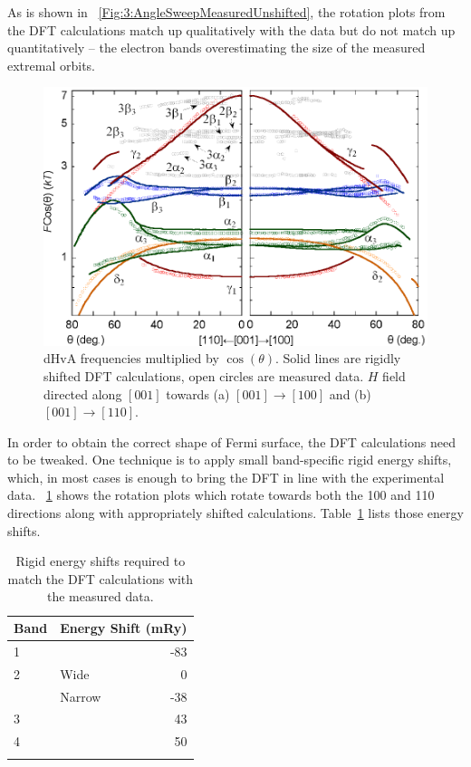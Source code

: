 As is shown in \fig~\ref{Fig:3:AngleSweepMeasuredUnshifted}, the rotation plots from the DFT calculations match up qualitatively with the data but do not match up quantitatively -- the electron bands overestimating the size of the measured extremal orbits. 

\begin{figure}[htbp]
    \begin{center}
        \includegraphics[scale=0.9]{Chapter3-dHvABaFe2P2/Figures/AngleDepMeasurements/AngleSweepRigidShift/AngleSweepRigidShift}
        \caption{dHvA frequencies multiplied by $\cos(\theta)$. Solid lines are rigidly shifted DFT calculations, open circles are measured data. $H$ field directed along $[001]$ towards (a) $[001]\rightarrow[100]$ and (b) $[001]\rightarrow[110]$.}
        \label{Fig:3:AngleSweepRigidShift}
    \end{center}
\end{figure}

In order to obtain the correct shape of Fermi surface, the DFT calculations need to be tweaked. One technique is to apply small band-specific rigid energy shifts, which, in most cases is enough to bring the DFT in line with the experimental data. \fig~\ref{Fig:3:AngleSweepRigidShift} shows the rotation plots which rotate towards both the 100 and 110 directions along with appropriately shifted calculations. Table~\ref{Table:3:EnergyShifts} lists those energy shifts.
\begin{table}
    \begin{center}
        \caption{Rigid energy shifts required to match the DFT calculations with the measured data.}
        \begin{tabular}[htbp]{llr}
\toprule
Band    & \multicolumn{2}{l}{Energy Shift (\unit{mRy})} \\
\midrule
1       &       & -83      \\
2       & Wide  & 0          \\
        & Narrow & -38     \\
3       &       & 43       \\
4       &       & 50        \\
\bottomrule
        \label{Table:3:EnergyShifts}
        \end{tabular}
    \end{center}
\end{table}

